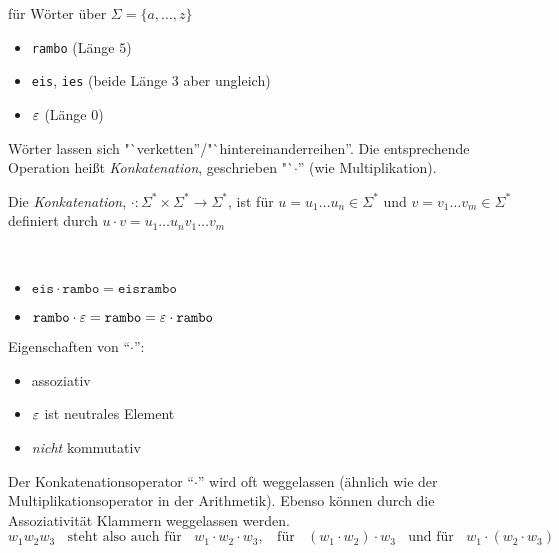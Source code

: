 \goodbreak

\begin{Bsp*} für Wörter über $\Sigma=\{a,\dots,z\}$
  \begin{itemize}
  \item \verb/rambo/ (Länge $5$)
  \item \verb/eis/, \verb/ies/ (beide Länge 3 aber ungleich) 
  \item $\varepsilon$ (Länge $0$)
  \qedhere
  \end{itemize}
\end{Bsp*}
Wörter lassen sich "`verketten''/"`hintereinanderreihen''.
Die entsprechende Operation heißt \emph{Konkatenation}, geschrieben "`$\cdot$'' (wie Multiplikation).
\begin{Def}
  Die \emph{Konkatenation}, $\mathord{\cdot} : \Sigma^* \times \Sigma^* \to \Sigma^*$, ist für $u=u_1\ldots u_n\in\Sigma^*$ und $v=v_1\ldots v_m\in\Sigma^*$ definiert durch
  $u\cdot v = u_1\ldots u_nv_1\ldots v_m$
\end{Def}
\begin{Bsp*} ~
  \begin{itemize}
  \item $\mathtt{eis}\cdot\mathtt{rambo} =\mathtt{eisrambo}$
  \item $\mathtt{rambo} \cdot \varepsilon = \mathtt{rambo} = \varepsilon \cdot \mathtt{rambo}$ 
  \qedhere
  \end{itemize}
\end{Bsp*}
Eigenschaften von "`$\cdot$"':
\begin{itemize}
\item assoziativ
\item $\varepsilon$ ist neutrales Element
\item \emph{nicht} kommutativ
\end{itemize}


Der Konkatenationsoperator "`$\cdot$"' wird oft weggelassen (ähnlich wie der Multiplikationsoperator in der Arithmetik).
Ebenso können durch die Assoziativität Klammern weggelassen werden.
\begin{displaymath}
  w_1w_2w_3 \;\; \text{ steht also auch für } \;\; w_1\cdot w_2\cdot w_3,\;\;\text{ für }\;\;  (w_1 \cdot w_2) \cdot w_3 \;\;\text{ und für }\;\; w_1 \cdot (w_2 \cdot w_3)
\end{displaymath}

